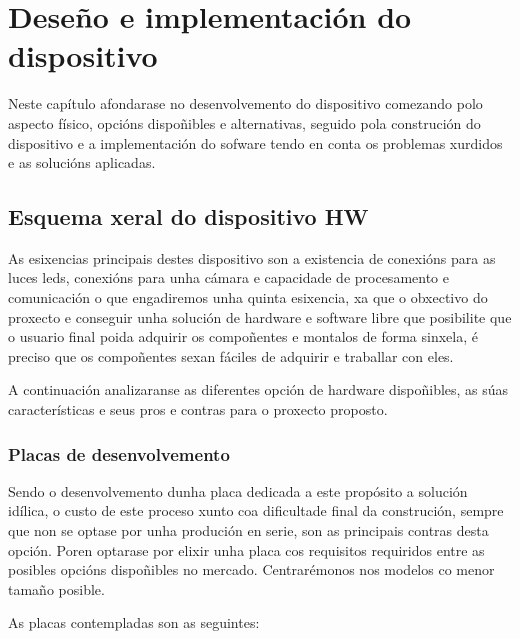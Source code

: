 \chapter{Deseño e implementación do dispositivo}
\label{chap:implementacion_dispositivo}
Neste capítulo afondarase no desenvolvemento do dispositivo comezando polo aspecto físico, opcións dispoñibles e alternativas, seguido pola construción do dispositivo e a implementación do sofware tendo en conta os problemas xurdidos e as solucións aplicadas.


\section{Esquema xeral do dispositivo HW}


As esixencias principais destes dispositivo son a existencia de conexións para as luces leds, conexións para unha cámara e capacidade de procesamento e comunicación o que engadiremos unha quinta esixencia, xa que o obxectivo do proxecto e conseguir unha solución de hardware e software libre que posibilite que o usuario final poida adquirir os compoñentes e montalos de forma sinxela, é preciso que os compoñentes sexan fáciles de adquirir e traballar con eles.

A continuación analizaranse as diferentes opción de hardware dispoñibles, as súas características e seus pros e contras para o proxecto proposto.

\subsection{Placas de desenvolvemento}


Sendo o desenvolvemento dunha placa dedicada a este propósito a solución idílica, o custo de este proceso xunto coa dificultade final da construción, sempre que non se optase por unha produción en serie, son as principais contras desta opción. Poren optarase por elixir unha placa cos requisitos requiridos entre as posibles opcións dispoñibles no mercado. Centrarémonos nos modelos co menor tamaño posible.

As placas contempladas son as seguintes:

